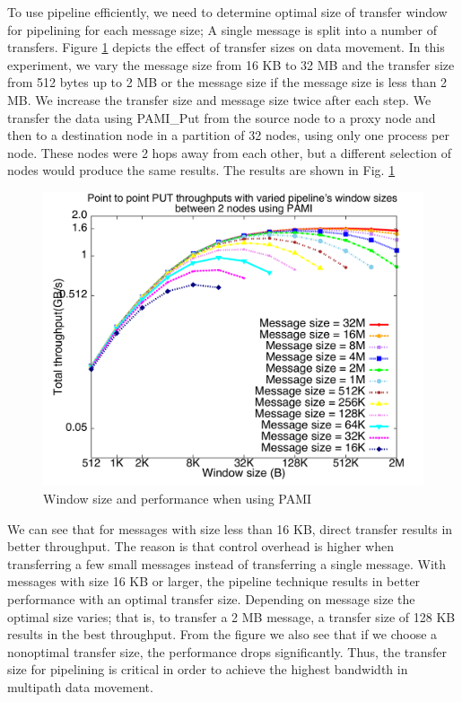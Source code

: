 \documentclass[final,5p,times]{elsarticle}
\begin{document}
To use pipeline efficiently, we need to determine optimal size of transfer window for pipelining for each message size; A single message is split into a number of transfers.  Figure \ref{fig:pipeline_winsize} depicts the effect of transfer sizes on data movement. In this experiment, we vary the message size from 16 KB to 32 MB and the transfer size from 512 bytes up to 2 MB or the message size if the message size is less than 2 MB.
We increase the transfer size and message size twice after each step. We transfer the data using PAMI\_Put from the source node to a proxy node and then to a destination node in a partition of 32 nodes, using only one process per node. These nodes were 2 hops away from each other, but a different selection of nodes would produce the same results. The results are shown in Fig. \ref{fig:pipeline_winsize}

\begin{figure}[!htb]
\centering
\includegraphics[scale=0.3]{winsize_pami.pdf}
\caption{Window size and performance when using PAMI}
\label{fig:pipeline_winsize}
\end{figure}

We can see that for messages with size less than 16 KB, direct transfer results in better throughput. The reason is that control overhead is higher when transferring a few small messages instead of transferring a single message. With messages with size 16 KB or larger, the pipeline technique results in better performance with an optimal transfer size. Depending on message size the optimal size varies; that is, to transfer a 2 MB message, a transfer size of 128 KB results in the best throughput. From the figure we also see that if we choose a nonoptimal transfer size, the performance drops significantly. Thus, the transfer size for pipelining is critical in order to achieve the highest bandwidth in multipath data movement.
\end{document}
